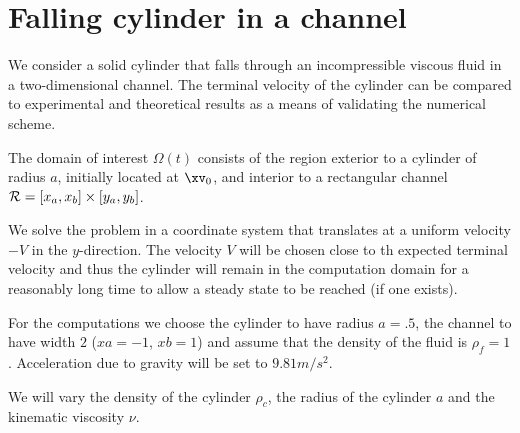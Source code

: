 \section{Falling cylinder in a channel} \label{sec:dropCyl}


We consider a solid cylinder that falls through an incompressible 
viscous fluid in a two-dimensional channel.
The terminal velocity of the cylinder can be compared to experimental
and theoretical results as a means of validating the numerical scheme.

The domain of interest $\Omega(t)$ consists of the
region exterior to a cylinder of radius $a$, initially located at $\xv_0$, and interior to a rectangular
channel ${\mathcal R}=[x_a,x_b]\times[y_a,y_b]$.


We solve the problem in a coordinate system that translates at a uniform velocity $-V$ in the $y$-direction.
The velocity $V$ will be chosen close to th expected terminal velocity and thus the cylinder will remain
in the computation domain for a reasonably long time to allow a steady state to be reached (if one exists).


For the computations we choose the cylinder to have radius $a=.5$,
the channel to have width $2$ ($xa=-1$, $xb=1$) and assume that the density
of the fluid is $\rho_f=1$. Acceleration due to gravity will be set to $9.81 m/s^2$. 

We will vary the density of the cylinder $\rho_c$, the radius of the cylinder $a$ and
the kinematic viscosity $\nu$.




